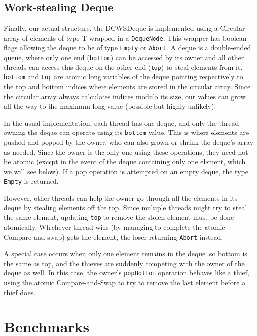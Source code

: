 \documentclass [10pt]{scrartcl}
\begin{document}
   
   \subsection{Work-stealing Deque}
   Finally, our actual structure, the DCWSDeque is implemented using a Circular array of elements of type T wrapped in a \texttt{DequeNode}. This wrapper has boolean flags allowing the deque to be of type \texttt{Empty} or \texttt{Abort}.\newline
   A deque is a double-ended queue, where only one end (\texttt{bottom}) can be accessed by its owner and all other threads can access this deque on the other end (\texttt{top}) to steal elements from it.
   \texttt{bottom} and \texttt{top} are atomic long variables of the deque pointing respectively to the top and bottom indices where elements are stored in the circular array. Since the circular array always calculates indices modulo its size, our values can grow all the way to the maximum long value (possible but highly unlikely).
   
   In the usual implementation, each thread has one deque, and only the thread owning the deque can operate using its \texttt{bottom} value. This is where elements are pushed and popped by the owner, who can also grown or shrink the deque's array as needed. Since the owner is the only one using these operations, they need not be atomic (except in the event of the deque containing only one element, which we will see below). If a pop operation is attempted on an empty deque, the type \texttt{Empty} is returned.
   
   However, other threads can help the owner go through all the elements in its deque by stealing elements off the top. Since multiple threads might try to steal the same element, updating \texttt{top} to remove the stolen element must be done atomically. Whichever thread wins (by managing to complete the atomic Compare-and-swap) gets the element, the loser returning \texttt{Abort} instead.
   
   A special case occurs when only one element remains in the deque, so bottom is the same as top, and the thieves are suddenly competing with the owner of the deque as well. In this case, the owner's \texttt{popBottom} operation behaves like a thief, using the atomic Compare-and-Swap to try to remove the last element before a thief does.
   
   \section{Benchmarks}
\end{document}
